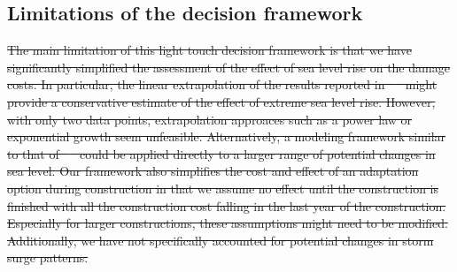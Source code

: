 \documentclass[draft,linenumbers]{agujournal}
\providecommand{\DIFadd}[1]{{\protect\color{blue}\uwave{#1}}} %
\providecommand{\DIFdel}[1]{{\protect\color{red}\sout{#1}}}                      %
\providecommand{\DIFaddbegin}{} %
\providecommand{\DIFaddend}{} %
\providecommand{\DIFdelbegin}{} %
\providecommand{\DIFdelend}{} %
\begin{document}
\DIFaddbegin 


\DIFaddend \subsection{Limitations of the decision framework}
\DIFdelbegin \DIFdel{The main limitation of this light touch decision framework is that we have significantly simplified the assessment of the effect of sea level rise on the damage costs. In particular, the linear extrapolation of the results reported in \mbox{%
\citet{Hallegatte&2013} }%
might provide a conservative estimate of the effect of extreme sea level rise. However, with only two data points, extrapolation approaces such as a power law or exponential growth seem unfeasible. Alternatively, a modeling framework similar to that of \mbox{%
\citet{Hallegatte&2013} }%
could be applied directly to a larger range of potential changes in sea level. Our framework also simplifies the cost and effect of an adaptation option during construction in that we assume no effect until the construction is finished with all the construction cost falling in the last year of the construction. Especially for larger constructions, these assumptions might need to be modified. Additionally, we have not specifically accounted for potential changes in storm surge patterns. }\DIFdelend 
\end{document}
